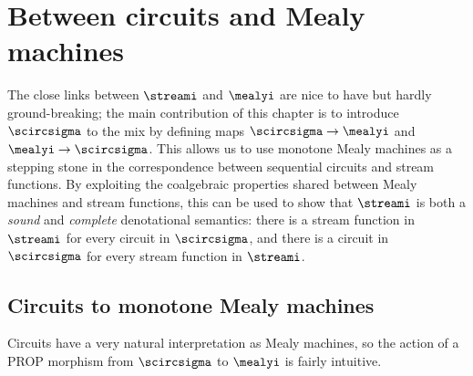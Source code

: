 \section{Between circuits and Mealy machines}\label{sec:synthesis}

The close links between \(\streami\) and \(\mealyi\) are nice to have but hardly
ground-breaking; the main contribution of this chapter is to introduce
\(\scircsigma\) to the mix by defining maps \(\scircsigma \to \mealyi\) and
\(\mealyi \to \scircsigma\).
This allows us to use monotone Mealy machines as a stepping stone in the
correspondence between sequential circuits and stream functions.
By exploiting the coalgebraic properties shared between Mealy machines and
stream functions, this can be used to show that \(\streami\) is both a
\emph{sound} and \emph{complete} denotational semantics: there is a stream
function in \(\streami\) for every circuit in \(\scircsigma\), and there is a
circuit in \(\scircsigma\) for every stream function in \(\streami\).

\subsection{Circuits to monotone Mealy machines}

Circuits have a very natural interpretation as Mealy machines, so the action
of a PROP morphism from \(\scircsigma\) to \(\mealyi\) is fairly intuitive.


